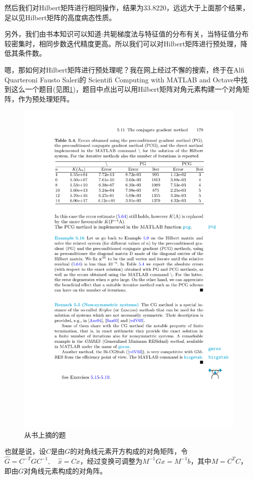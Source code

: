 然后我们对Hilbert矩阵进行相同操作，结果为33.8220，远远大于上面那个结果，足以见Hilbert矩阵的高度病态性质。

另外，我们由书本知识可以知道:共轭梯度法与特征值的分布有关，当特征值分布较密集时，相同步数迭代精度更高。所以我们可以对Hilbert矩阵进行预处理，降低其条件数。

嗯，那如何对Hilbert矩阵进行预处理呢？我在网上经过不懈的搜索，终于在Alfi Quarteroni Fausto Saleri的 Scientifi Computing with MATLAB and Octave中找到这么一个题目(见图\ref{exam})，题目中点出可以用Hilbert矩阵对角元素构建一个对角矩阵，作为预处理矩阵。

\begin{figure}[H]
\centering
\includegraphics[width=12cm]{fig/5_5.pdf}
\caption{从书上摘的题}
\label{exam}
\end{figure}

也就是说，设$C$是由$G$的对角线元素开方构成的对角矩阵，令$\hat{G}=C^{-T}GC^{-1},\quad \hat{x}=Cx$，经过变换可调整为$M^{-1}Gx=M^{-1}b$，其中$M=C^TC$，即由$G$对角线元素构成的对角阵。

